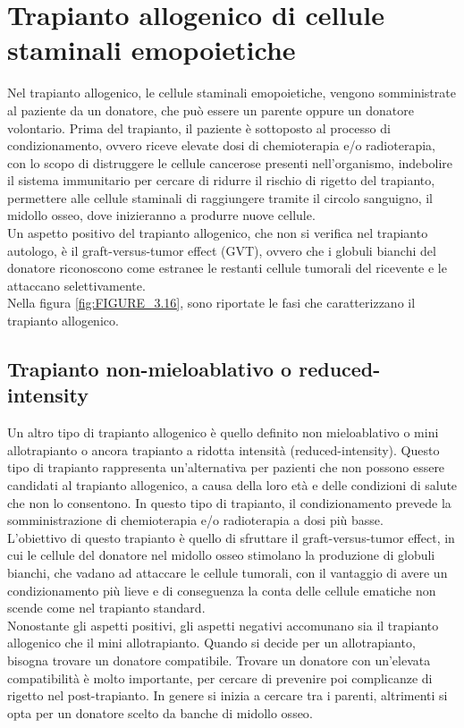 \section{Trapianto allogenico di cellule staminali emopoietiche}

Nel trapianto allogenico, le cellule staminali emopoietiche, vengono somministrate al paziente da un donatore, 
che può essere un parente oppure un donatore volontario. 
Prima del trapianto, il paziente è sottoposto al processo di condizionamento, ovvero riceve elevate dosi di 
chemioterapia e/o radioterapia, con lo scopo di distruggere le cellule cancerose presenti nell’organismo, 
indebolire il sistema immunitario per cercare di ridurre il rischio di rigetto del trapianto, permettere alle 
cellule staminali di raggiungere tramite il circolo sanguigno, il midollo osseo, dove inizieranno a produrre nuove 
cellule.\\
Un aspetto positivo del trapianto allogenico, che non si verifica nel trapianto autologo, è il graft-versus-tumor 
effect (GVT), ovvero che i globuli bianchi del donatore riconoscono come estranee le restanti cellule tumorali 
del ricevente e le attaccano selettivamente\cite{LLSBLOOD}.\\ Nella figura \ref{fig:FIGURE_3.16}, 
sono riportate le fasi che caratterizzano il trapianto allogenico.\\

\subsection{Trapianto non-mieloablativo o reduced-intensity}

Un altro tipo di trapianto allogenico è quello definito non mieloablativo o mini allotrapianto o ancora trapianto a 
ridotta intensità (reduced-intensity). Questo tipo di trapianto rappresenta un’alternativa per pazienti che non 
possono essere candidati al trapianto allogenico, a causa della loro età e delle condizioni di salute che non lo 
consentono. In questo tipo di trapianto, il condizionamento prevede la somministrazione di 
chemioterapia e/o radioterapia a dosi più basse\cite{LLSBLOOD}.\\
L’obiettivo di questo trapianto è quello di sfruttare il graft-versus-tumor effect, in cui le cellule del donatore 
nel midollo osseo stimolano la produzione di globuli bianchi, che vadano ad attaccare le cellule tumorali, con il 
vantaggio di avere un condizionamento più lieve e di conseguenza la conta delle cellule ematiche 
non scende come nel trapianto standard\cite{STEMCELLS}.\\
Nonostante gli aspetti positivi, gli aspetti negativi accomunano sia il trapianto allogenico che il mini allotrapianto.
Quando si decide per un allotrapianto, bisogna trovare un donatore compatibile. Trovare un donatore con 
un’elevata compatibilità è molto importante, per cercare di prevenire poi complicanze di rigetto nel post-trapianto. 
In genere si inizia a cercare tra i parenti, altrimenti si opta per un donatore scelto da banche di midollo osseo\cite{TRAPIANTO}.\\

